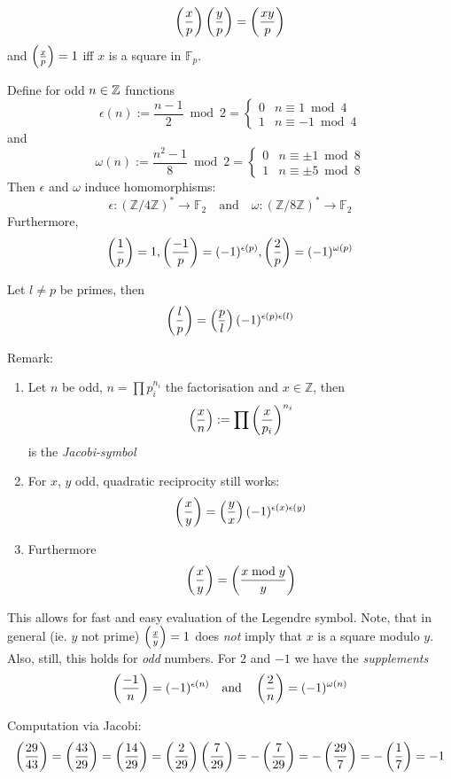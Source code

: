 \begin{remark}
$$\left(\frac{x}{p}\right) \left(\frac{y}{p}\right) = \left(\frac{xy}{p}\right)$$
and
$\left(\frac{x}{p}\right) = 1$ iff $x$ is a square in $\mathbb F_p$.
\end{remark}
\begin{theorem}
Define for odd $n\in {\mathbb Z}$ functions 
$$\epsilon(n) := \frac{n-1} 2 \bmod 2 = \begin{cases} 0 & n\equiv 1 \bmod 4\\
                                                      1 & n \equiv -1 \bmod 4
                                                      \end{cases}$$
and
$$\omega(n) := \frac{n^2-1} 8 \bmod 2 = \begin{cases} 0 & n \equiv \pm 1 \bmod 8\\
                                                      1 & n \equiv \pm 5 \bmod 8
                                                      \end{cases}$$
Then $\epsilon$ and $\omega$ induce homomorphisms:
$$\epsilon : (\mathbb Z/4\mathbb Z)^* \to \mathbb F_2\quad\text{and}\quad
\omega: (\mathbb Z/8\mathbb Z)^* \to \mathbb F_2$$
Furthermore, 
$$\left(\frac{1}{p}\right) = 1, \left(\frac{-1}{p}\right) = (-1)^{\epsilon(p)}, \left(\frac{2}{p}\right) = (-1)^{\omega(p)}$$
\end{theorem}
\begin{theorem}
Let $l\ne p$ be primes, then 
$$\left(\frac{l}{p}\right) = \left(\frac{p}{l}\right) (-1)^{\epsilon(p)\epsilon(l)}$$
\end{theorem}
Remark:
\begin{enumerate}
  \item Let $n$ be odd, $n=\prod p_i^{n_i}$ the factorisation and $x\in\mathbb Z$, then
    $$\left(\frac{x}{n}\right) := \prod \left(\frac{x}{p_i}\right) ^{n_i}$$
    is the {\em Jacobi-symbol}
  \item For $x$, $y$ odd, quadratic reciprocity still works:
    $$\left(\frac{x}{y}\right) = \left(\frac{y}{x}\right) (-1)^{\epsilon(x)\epsilon(y)}$$
  \item Furthermore 
    $$\left(\frac{x}{y}\right) = \left(\frac{x\bmod y}{y}\right)$$
\end{enumerate}
This allows for fast and easy evaluation of the Legendre symbol.
Note, that in general (ie. $y$ not prime) $\left(\frac{x}{y}\right) = 1$ does {\em not}
imply that $x$ is a square modulo $y$. Also, still, this holds for {\em odd}
numbers.
For $2$ and $-1$ we have the {\em supplements}
$$\left(\frac{-1}{n}\right) = (-1)^{\epsilon(n)}\quad\text{and}\quad\left(\frac{2}{n}\right) = (-1)^{\omega(n)}$$
\begin{remark}
Computation via Jacobi:
  $$\left(\frac{29}{43}\right) = \left(\frac{43}{29}\right) = \left(\frac{14}{29}\right) = \left(\frac{2}{29}\right)\left(\frac{7}{29}\right) = - \left(\frac{7}{29}\right) = -\left(\frac{29}{7}\right) = -\left(\frac{1}{7}\right) = -1$$
\end{remark}

